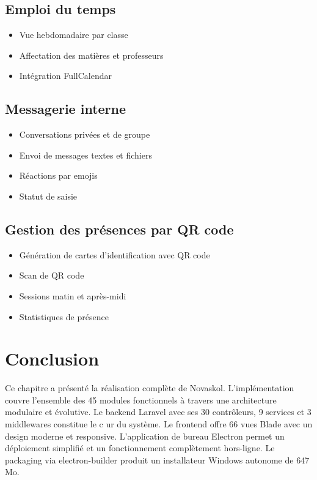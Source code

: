 \documentclass[12pt,a4paper,twoside]{report}
\begin{document}
\subsection{Emploi du temps}
\begin{itemize}
    \item Vue hebdomadaire par classe
    \item Affectation des matières et professeurs
    \item Intégration FullCalendar
\end{itemize}

\subsection{Messagerie interne}
\begin{itemize}
    \item Conversations privées et de groupe
    \item Envoi de messages textes et fichiers
    \item Réactions par emojis
    \item Statut de saisie
\end{itemize}

\subsection{Gestion des présences par QR code}
\begin{itemize}
    \item Génération de cartes d'identification avec QR code
    \item Scan de QR code
    \item Sessions matin et après-midi
    \item Statistiques de présence
\end{itemize}

\section{Conclusion}

Ce chapitre a présenté la réalisation complète de Novaskol. L'implémentation couvre l'ensemble des 45 modules fonctionnels à travers une architecture modulaire et évolutive. Le backend Laravel avec ses 30 contrôleurs, 9 services et 3 middlewares constitue le c ur du système. Le frontend offre 66 vues Blade avec un design moderne et responsive. L'application de bureau Electron permet un déploiement simplifié et un fonctionnement complètement hors-ligne. Le packaging via electron-builder produit un installateur Windows autonome de 647 Mo.
\end{document}
